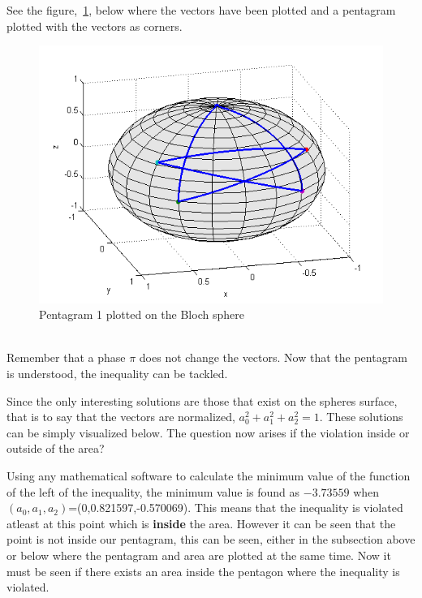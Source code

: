 See the figure,~\ref{fig:penta1}, below where the vectors have been plotted and a pentagram plotted with the vectors as corners.
\begin{figure}[h!]
\begin{center}
\includegraphics[scale=0.6]{penta1.png}
\caption{Pentagram 1 plotted on the Bloch sphere}
\label{fig:penta1}
\end{center}
\end{figure}
\\
Remember that a phase $\pi$ does not change the vectors. Now that the pentagram is understood, the inequality can be tackled. 

Since the only interesting solutions are those that exist on the spheres surface, that is to say that the vectors are normalized, $a_0^2+a_1^2+a_2^2=1$. These solutions can be simply visualized below. The question now arises if the violation inside or outside of the area?

Using any mathematical software to calculate the minimum value of the function of the left of the inequality, the minimum value is found as $-3.73559$ when $(a_0,a_1,a_2)$=(0,0.821597,-0.570069). This means that the inequality is violated atleast at this point which is \textbf{inside} the area. However it can be seen that the point is not inside our pentagram, this can be seen, either in the subsection above or below where the pentagram and area are plotted at the same time.
Now it must be seen if there exists an area inside the pentagon where the inequality is violated. 


